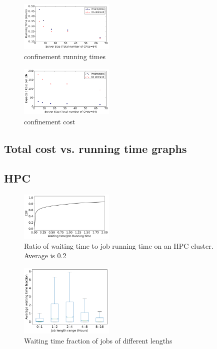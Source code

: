 \begin{figure}[h]
  \centering
  \includegraphics[width=0.4\textwidth]{../graphs/confin_64_time.pdf}
  \caption{confinement running times}
  \label{fig:confin-64-times}
\end{figure}


\begin{figure}[h]
  \centering
  \includegraphics[width=0.4\textwidth]{../graphs/confin_64_cost.pdf}
  \caption{confinement cost}
  \label{fig:confin-64-cost}
\end{figure}



\subsection{Total cost vs. running time graphs}

\subsection{HPC}

\begin{figure}
  \includegraphics[width=0.4\textwidth]{../data/waiting_all.pdf}
  \caption{Ratio of waiting time to job running time on an HPC cluster. Average is 0.2}
  \label{fig:hpc-wait-cdf}
\end{figure}



\begin{figure}
  \includegraphics[width=0.4\textwidth]{../graphs/waiting_time_buckets.pdf}
  \caption{Waiting time fraction of jobs of different lengths}
  \label{fig:hpc-wait-buckets}  
\end{figure}

